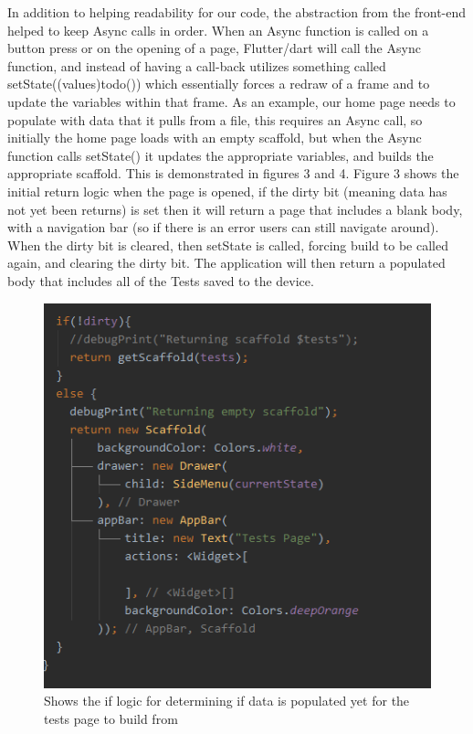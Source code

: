 \documentclass[onecolumn, draftclsnofoot,10pt, compsoc]{IEEEtran}
\begin{document}
In addition to helping readability for our code, the abstraction from the front-end helped to keep Async calls in order. When an Async function is called on a button press or on the opening of a page, Flutter/dart will call the Async function, and instead of having a call-back utilizes something called setState((values){todo()}) which essentially forces a redraw of a frame and to update the variables within that frame. As an example, our home page needs to populate with data that it pulls from a file, this requires an Async call, so initially the home page loads with an empty scaffold, but when the Async function calls setState() it updates the appropriate variables, and builds the appropriate scaffold. This is demonstrated in figures 3 and 4. Figure 3 shows the initial return logic when the page is opened, if the dirty bit (meaning data has not yet been returns) is set then it will return a page that includes a blank body, with a navigation bar (so if there is an error users can still navigate around). When the dirty bit is cleared, then setState is called, forcing build to be called again, and clearing the dirty bit. The application will then return a populated body that includes all of the Tests saved to the device.\newpage
\begin{figure}[!htb]
    \centering
    \includegraphics[scale=0.5]{Images/Capture3.PNG}
    \caption{ Shows the if logic for determining if data is populated yet for the tests page to build from}
\end{figure}
\end{document}
